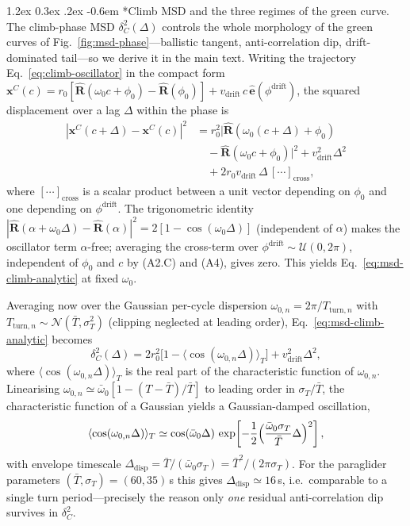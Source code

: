 \documentclass[11pt,a4paper]{article}
\makeatletter
\renewcommand\paragraph{\@startsection{paragraph}{4}{\z@}%
  {1.2ex \@plus 0.3ex \@minus .2ex}%
  {-0.6em}%
  {\normalfont\normalsize\itshape}}
\makeatother
\begin{document}
\paragraph*{Climb MSD and the three regimes of the green curve.}
The climb-phase MSD $\delta^2_C(\Delta)$ controls the whole
morphology of the green curves of
Fig.~\ref{fig:msd-phase}---ballistic tangent, anti-correlation dip,
drift-dominated tail---so we derive it in the main text. Writing
the trajectory Eq.~\eqref{eq:climb-oscillator} in the compact form
$\mathbf{x}^C(c) = r_0[\hat{\mathbf{R}}(\omega_0 c + \phi_0)
-\hat{\mathbf{R}}(\phi_0)]+v_{\mathrm{drift}}\,c\,
\hat{\mathbf{e}}(\phi^{\mathrm{drift}})$, the squared displacement
over a lag $\Delta$ within the phase is
\begin{align}
|\mathbf{x}^C(c+\Delta) - \mathbf{x}^C(c)|^2
&= r_0^2\bigl|\hat{\mathbf{R}}(\omega_0(c+\Delta)+\phi_0) \nonumber\\
&\quad -\hat{\mathbf{R}}(\omega_0 c+\phi_0)\bigr|^2
 + v_{\mathrm{drift}}^2\Delta^2 \nonumber\\
&\quad + 2 r_0 v_{\mathrm{drift}}\,\Delta\,[\cdots]_{\mathrm{cross}},
\label{eq:climb-expand}
\end{align}
where $[\cdots]_{\mathrm{cross}}$ is a scalar product between a
unit vector depending on $\phi_0$ and one depending on
$\phi^{\mathrm{drift}}$. The trigonometric identity
$|\hat{\mathbf{R}}(\alpha+\omega_0\Delta)-\hat{\mathbf{R}}(\alpha)|^2
= 2[1-\cos(\omega_0\Delta)]$ (independent of $\alpha$) makes the
oscillator term $\alpha$-free; averaging the cross-term over
$\phi^{\mathrm{drift}}\sim\mathcal{U}(0,2\pi)$, independent of
$\phi_0$ and $c$ by (A2.C) and (A4), gives zero. This yields
Eq.~\eqref{eq:msd-climb-analytic} at fixed $\omega_0$.

Averaging now over the Gaussian per-cycle dispersion
$\omega_{0,n} = 2\pi/T_{\mathrm{turn},n}$ with
$T_{\mathrm{turn},n}\sim\mathcal{N}(\bar{T},\sigma_T^2)$ (clipping
neglected at leading order), Eq.~\eqref{eq:msd-climb-analytic}
becomes
\begin{equation}
\delta^2_C(\Delta)
= 2 r_0^2\bigl[1-\langle\cos(\omega_{0,n}\Delta)\rangle_T\bigr]
+ v_{\mathrm{drift}}^2\Delta^2,
\end{equation}
where $\langle\cos(\omega_{0,n}\Delta)\rangle_T$ is the real part
of the characteristic function of $\omega_{0,n}$. Linearising
$\omega_{0,n}\simeq \bar{\omega}_0[1-(T-\bar{T})/\bar{T}]$ to
leading order in $\sigma_T/\bar{T}$, the characteristic function of
a Gaussian yields a Gaussian-damped oscillation,
\begin{equation}
\langle\cos(\omega_{0,n}\Delta)\rangle_T
\simeq \cos(\bar{\omega}_0\Delta)\,
\exp\!\left[-\frac{1}{2}
\Bigl(\frac{\bar{\omega}_0 \sigma_T}{\bar{T}}\Delta\Bigr)^2\right],
\label{eq:climb-damping}
\end{equation}
with envelope timescale
$\Delta_{\mathrm{disp}}= \bar{T}/(\bar{\omega}_0\sigma_T)=
\bar{T}^2/(2\pi\sigma_T)$. For the paraglider parameters
$(\bar{T},\sigma_T)=(60,35)$\,s this gives
$\Delta_{\mathrm{disp}}\simeq 16$\,s, i.e.\ comparable to a single
turn period---precisely the reason only \emph{one} residual
anti-correlation dip survives in $\delta^2_C$.
\end{document}
